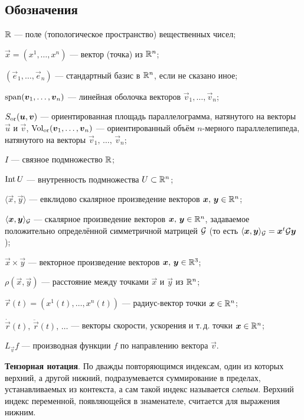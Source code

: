 \subsection*{Обозначения}

\begin{center}
	\begin{minipage}{.9\textwidth}
		$\mathbb{R}$ --- поле (топологическое пространство) вещественных чисел;

		$\vec{x} = (x^1, \ldots, x^n)$ --- вектор (точка) из $\mathbb{R}^n$;
		
		$(\vec{e}_1, \ldots, \vec{e}_n)$ --- стандартный базис в $\mathbb{R}^n$, если не сказано иное;

		$\operatorname{span}(\boldsymbol{v}_1, \ldots, \boldsymbol{v}_n)$ --- линейная оболочка векторов $\vec{v}_1, \ldots, \vec{v}_n$;

		$S_{\mathrm{or}}(\boldsymbol{u}, \boldsymbol{v})$ --- ориентированная площадь параллелограмма, натянутого на векторы $\vec{u}$ и $\vec{v}$, $\operatorname{Vol}_{\mathrm{or}}(\boldsymbol{v}_1, \ldots, \boldsymbol{v}_n)$ --- ориентированный объём $n$-мерного параллелепипеда, натянутого на векторы $\vec{v}_1,\,\ldots,\,\vec{v}_n$;

		$I$ --- связное подмножество $\mathbb{R}$;

		$\operatorname{Int} U$ --- внутренность подмножества $U \subset \mathbb{R}^n$;

		$\langle\vec{x}, \vec{y}\rangle$ --- евклидово скалярное произведение векторов $\boldsymbol{x},\,\boldsymbol{y} \in \mathbb{R}^n$;

		$\langle\boldsymbol{x}, \boldsymbol{y}\rangle_{\mathcal{G}}$ --- скалярное произведение векторов $\boldsymbol{x},\,\boldsymbol{y} \in \mathbb{R}^n$, задаваемое положительно определённой симметричной матрицей $\mathcal{G}$ (то есть $\langle\boldsymbol{x}, \boldsymbol{y}\rangle_{\mathcal{G}} = \boldsymbol{x}^t\mathcal{G}\boldsymbol{y}$);

		$\vec{x} \times \vec{y}$ --- векторное произведение векторов $\boldsymbol{x},\,\boldsymbol{y} \in \mathbb{R}^3$;

		$\rho(\vec{x}, \vec{y})$ --- расстояние между точками $\vec{x}$ и $\vec{y}$ из $\mathbb{R}^n$;

		$\vec{r}(t) = (x^1(t), \ldots, x^n(t))$ --- радиус-вектор точки $\boldsymbol{x} \in \mathbb{R}^n$;

		$\dot{\vec{r}}(t),\,\ddot{\vec{r}}(t),\,\ldots$ --- векторы скорости, ускорения и т.\,д. точки $\boldsymbol{x} \in \mathbb{R}^n$;

		$L_{\vec{v}}f$ --- производная функции $f$ по направлению вектора $\vec{v}$.

		\medskip
		\textbf{Тензорная нотация}. {\small По дважды повторяющимся индексам, один из которых верхний, а другой нижний, подразумевается суммирование в пределах, устанавливаемых из контекста, а сам такой индекс называется \textit{слепым}. Верхний индекс переменной, появляющейся в знаменателе, считается для выражения нижним.}
	\end{minipage}
\end{center}

